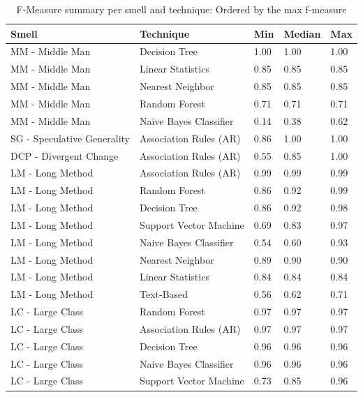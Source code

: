 \begin{small}
\begin{longtable} {|l|l|l|l|l|}
\caption{F-Measure summary per smell and technique: Ordered by the max f-measure}
\label{tab:opensourceTable}
\\

\hline
Smell            & Technique                          & Min   & Median & Max    \\ \hline
MM - Middle Man              & Decision Tree          & 1.00  & 1.00   & 1.00  \\ \hline
MM - Middle Man              & Linear Statistics      & 0.85  & 0.85   & 0.85  \\ \hline
MM - Middle Man              & Nearest Neighbor       & 0.85  & 0.85   & 0.85  \\ \hline
MM - Middle Man              & Random Forest          & 0.71  & 0.71   & 0.71  \\ \hline
MM - Middle Man              & Naive Bayes Classifier & 0.14  & 0.38   & 0.62  \\ \hline\hline

SG - Speculative Generality  & Association Rules (AR) & 0.86  & 1.00   & 1.00  \\ \hline\hline

DCP - Divergent Change       & Association Rules (AR) & 0.55  & 0.85   & 1.00  \\ \hline\hline

LM - Long Method             & Association Rules (AR) & 0.99  & 0.99   & 0.99  \\ \hline
LM - Long Method             & Random Forest          & 0.86  & 0.92   & 0.99  \\ \hline
LM - Long Method             & Decision Tree          & 0.86  & 0.92   & 0.98  \\ \hline
LM - Long Method             & Support Vector Machine & 0.69  & 0.83   & 0.97  \\ \hline
LM - Long Method             & Naive Bayes Classifier & 0.54  & 0.60   & 0.93  \\ \hline
LM - Long Method             & Nearest Neighbor       & 0.89  & 0.90   & 0.90  \\ \hline
LM - Long Method             & Linear Statistics      & 0.84  & 0.84   & 0.84  \\ \hline
LM - Long Method             & Text-Based             & 0.56  & 0.62   & 0.71  \\ \hline\hline

LC - Large Class             & Random Forest          & 0.97  & 0.97   & 0.97  \\ \hline
LC - Large Class             & Association Rules (AR) & 0.97  & 0.97   & 0.97  \\ \hline
LC - Large Class             & Decision Tree          & 0.96  & 0.96   & 0.96  \\ \hline
LC - Large Class             & Naive Bayes Classifier & 0.96  & 0.96   & 0.96  \\ \hline
LC - Large Class             & Support Vector Machine & 0.73  & 0.85   & 0.96  \\ \hline\hline


\end{longtable}
\end{small}
